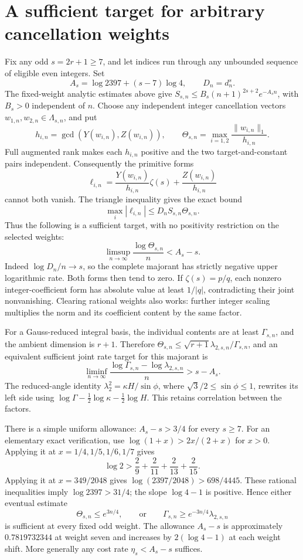 \documentclass[11pt]{article}
\theoremstyle{remark}
\begin{document}
\section{A sufficient target for arbitrary cancellation weights}
Fix any odd \(s=2r+1\ge7\), and let indices run through any unbounded
sequence of eligible even integers. Set
\[
 A_s=\log2397+(s-7)\log4,\qquad D_n=d_n^s.
\]
The fixed-weight analytic estimates above give
\(S_{s,n}\le B_s(n+1)^{2s+2}e^{-A_sn}\), with \(B_s>0\)
independent of \(n\). Choose any independent integer cancellation
vectors \(w_{1,n},w_{2,n}\in\Lambda_{s,n}\), and put
\[
 h_{i,n}=\gcd(Y(w_{i,n}),Z(w_{i,n})),\qquad
 \Theta_{s,n}=\max_{i=1,2}\frac{\|w_{i,n}\|_1}{h_{i,n}}.
\]
Full augmented rank makes each \(h_{i,n}\) positive and the two
target-and-constant pairs independent. Consequently the primitive forms
\[
 \ell_{i,n}=\frac{Y(w_{i,n})}{h_{i,n}}\zeta(s)
              +\frac{Z(w_{i,n})}{h_{i,n}}
\]
cannot both vanish. The triangle inequality gives the exact bound
\[
 \max_i|\ell_{i,n}|\le D_n S_{s,n}\Theta_{s,n}.
\]
Thus the following is a sufficient target, with no positivity restriction
on the selected weights:
\begin{equation}
 \limsup_{n\to\infty}\frac{\log\Theta_{s,n}}n<A_s-s.
 \label{eq:arbitrary-weight-target}
\end{equation}
Indeed \(\log D_n/n\to s\), so the complete majorant has strictly
negative upper logarithmic rate. Both forms then tend to zero. If
\(\zeta(s)=p/q\), each nonzero integer-coefficient form has absolute
value at least \(1/|q|\), contradicting their joint nonvanishing.
Clearing rational weights also works: further integer scaling multiplies
the norm and its coefficient content by the same factor.

For a Gauss-reduced integral basis, the individual contents are at least
\(\Gamma_{s,n}\), and the ambient dimension is \(r+1\). Therefore
\(\Theta_{s,n}\le\sqrt{r+1}\lambda_{2,s,n}/\Gamma_{s,n}\), and an
equivalent sufficient joint rate target for this majorant is
\begin{equation}
 \liminf_{n\to\infty}
 \frac{\log\Gamma_{s,n}-\log\lambda_{2,s,n}}n>s-A_s.
 \label{eq:arbitrary-weight-joint-target}
\end{equation}
The reduced-angle identity
\(\lambda_2^2=\kappa H/\sin\phi\), where
\(\sqrt3/2\le\sin\phi\le1\), rewrites its left side using
\(\log\Gamma-\tfrac12\log\kappa-\tfrac12\log H\).
This retains correlation between the factors.

There is a simple uniform allowance: \(A_s-s>3/4\) for every \(s\ge7\).
For an elementary exact verification, use
\(\log(1+x)>2x/(2+x)\) for \(x>0\). Applying it at
\(x=1/4,1/5,1/6,1/7\) gives
\[
 \log2>\frac29+\frac2{11}+\frac2{13}+\frac2{15}.
\]
Applying it at \(x=349/2048\) gives
\(\log(2397/2048)>698/4445\). These rational inequalities imply
\(\log2397>31/4\); the slope \(\log4-1\) is positive.
Hence either eventual estimate
\[
 \Theta_{s,n}\le e^{3n/4},\qquad\text{or}\qquad
 \Gamma_{s,n}\ge e^{-3n/4}\lambda_{2,s,n}
\]
is sufficient at every fixed odd weight. The allowance \(A_s-s\) is
approximately \(0.7819732344\) at weight seven and increases by
\(2(\log4-1)\) at each weight shift. More generally any cost rate
\(\eta_s<A_s-s\) suffices.
\end{document}

